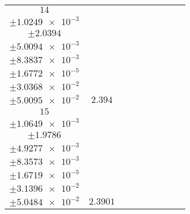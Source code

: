 \documentclass[8pt]{article}
\begin{document}
\begin{longtable}[l]{c c c c c c c c c}
$\num{14}$ & \begin{tabular}[c]{@{}c@{}}$\num{2.9472e-2}$ \\ $\pm\num{1.0249e-3}$\end{tabular} & \begin{tabular}[c]{@{}c@{}}$\num{0.203}$ \\ $\pm\num{2.0394}$\end{tabular} & \begin{tabular}[c]{@{}c@{}}$\num{-0.321}$ \\ $\pm\num{5.0094e-3}$\end{tabular} & \begin{tabular}[c]{@{}c@{}}$\num{3.6264e+3}$ \\ $\pm\num{8.3837e-3}$\end{tabular} & \begin{tabular}[c]{@{}c@{}}$\num{7.2549}$ \\ $\pm\num{1.6772e-5}$\end{tabular} & \begin{tabular}[c]{@{}c@{}}$\num{1.1744}$ \\ $\pm\num{3.0368e-2}$\end{tabular} & \begin{tabular}[c]{@{}c@{}}$\num{4.1079}$ \\ $\pm\num{5.0095e-2}$\end{tabular} & $\num{2.394}$\\
$\num{15}$ & \begin{tabular}[c]{@{}c@{}}$\num{2.9454e-2}$ \\ $\pm\num{1.0649e-3}$\end{tabular} & \begin{tabular}[c]{@{}c@{}}$\num{1.7243e-2}$ \\ $\pm\num{1.9786}$\end{tabular} & \begin{tabular}[c]{@{}c@{}}$\num{0.32086}$ \\ $\pm\num{4.9277e-3}$\end{tabular} & \begin{tabular}[c]{@{}c@{}}$\num{3.6271e+3}$ \\ $\pm\num{8.3573e-3}$\end{tabular} & \begin{tabular}[c]{@{}c@{}}$\num{7.2562}$ \\ $\pm\num{1.6719e-5}$\end{tabular} & \begin{tabular}[c]{@{}c@{}}$\num{1.1753}$ \\ $\pm\num{3.1396e-2}$\end{tabular} & \begin{tabular}[c]{@{}c@{}}$\num{4.1093}$ \\ $\pm\num{5.0484e-2}$\end{tabular} & $\num{2.3901}$\\

\end{longtable}
\end{document}
